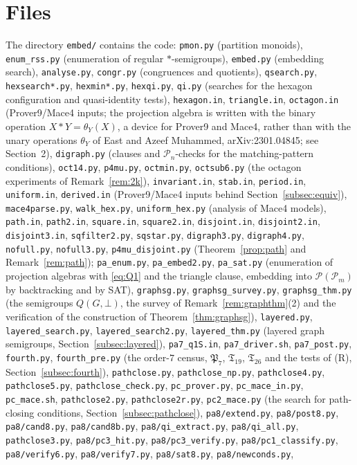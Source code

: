\documentclass[11pt]{amsart}
\theoremstyle{definition}
\renewcommand{\P}{\mathcal{P}}
\begin{document}
\section*{Files}
The directory \texttt{embed/} contains the code: \texttt{pmon.py} (partition monoids), \texttt{enum\_rss.py} (enumeration of regular $*$-semigroups), \texttt{embed.py} (embedding search), \texttt{analyse.py}, \texttt{congr.py} (congruences and quotients), \texttt{qsearch.py}, \texttt{hexsearch*.py}, \texttt{hexmin*.py}, \texttt{hexqi.py}, \texttt{qi.py} (searches for the hexagon configuration and quasi-identity tests), \texttt{hexagon.in}, \texttt{triangle.in}, \texttt{octagon.in} (Prover9/Mace4 inputs; the projection algebra is written with the binary operation $X*Y=\theta_Y(X)$, a device for Prover9 and Mace4, rather than with the unary operations $\theta_Y$ of East and Azeef Muhammed, arXiv:2301.04845; see Section~2), \texttt{digraph.py} (clauses and $\P_n$-checks for the matching-pattern conditions), \texttt{oct14.py}, \texttt{p4mu.py}, \texttt{octmin.py}, \texttt{octsub6.py} (the octagon experiments of Remark~\ref{rem:2k}), \texttt{invariant.in}, \texttt{stab.in}, \texttt{period.in}, \texttt{uniform.in}, \texttt{derived.in} (Prover9/Mace4 inputs behind Section~\ref{subsec:equiv}), \texttt{mace4parse.py}, \texttt{walk\_hex.py}, \texttt{uniform\_hex.py} (analysis of Mace4 models), \texttt{path.in}, \texttt{path2.in}, \texttt{square.in}, \texttt{square2.in}, \texttt{disjoint.in}, \texttt{disjoint2.in}, \texttt{disjoint3.in}, \texttt{sqfilter2.py}, \texttt{sqstar.py}, \texttt{digraph3.py}, \texttt{digraph4.py}, \texttt{nofull.py}, \texttt{nofull3.py}, \texttt{p4mu\_disjoint.py} (Theorem~\ref{prop:path} and Remark~\ref{rem:path}); \texttt{pa\_enum.py}, \texttt{pa\_embed2.py}, \texttt{pa\_sat.py} (enumeration of projection algebras with \eqref{eq:Q1} and the triangle clause, embedding into $\P(\P_m)$ by backtracking and by SAT), \texttt{graphsg.py}, \texttt{graphsg\_survey.py}, \texttt{graphsg\_thm.py} (the semigroups $Q(G,\bot)$, the survey of Remark~\ref{rem:graphthm}(2) and the verification of the construction of Theorem~\ref{thm:graphsg}), \texttt{layered.py}, \texttt{layered\_search.py}, \texttt{layered\_search2.py}, \texttt{layered\_thm.py} (layered graph semigroups, Section~\ref{subsec:layered}), \texttt{pa7\_q1S.in}, \texttt{pa7\_driver.sh}, \texttt{pa7\_post.py}, \texttt{fourth.py}, \texttt{fourth\_pre.py} (the order-$7$ census, $\mathfrak P_7$, $\mathfrak T_{19}$, $\mathfrak T_{26}$ and the tests of (R), Section~\ref{subsec:fourth}), \texttt{pathclose.py}, \texttt{pathclose\_np.py}, \texttt{pathclose4.py}, \texttt{pathclose5.py}, \texttt{pathclose\_check.py}, \texttt{pc\_prover.py}, \texttt{pc\_mace\_in.py}, \texttt{pc\_mace.sh}, \texttt{pathclose2.py}, \texttt{pathclose2r.py}, \texttt{pc2\_mace.py} (the search for path-closing conditions, Section~\ref{subsec:pathclose}), \texttt{pa8/extend.py}, \texttt{pa8/post8.py}, \texttt{pa8/cand8.py}, \texttt{pa8/cand8b.py}, \texttt{pa8/qi\_extract.py}, \texttt{pa8/qi\_all.py}, \texttt{pathclose3.py}, \texttt{pa8/pc3\_hit.py}, \texttt{pa8/pc3\_verify.py}, \texttt{pa8/pc1\_classify.py}, \texttt{pa8/verify6.py}, \texttt{pa8/verify7.py}, \texttt{pa8/sat8.py}, \texttt{pa8/newconds.py}, 
\end{document}
